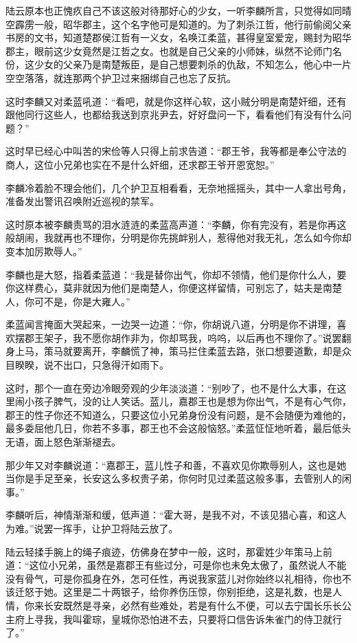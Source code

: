 陆云原本也正愧疚自己不该这般对待那好心的少女，一听李麟所言，只觉得如同晴空霹雳一般，昭华郡主，这个名字他可是知道的。为了刺杀江哲，他行前偷阅父亲书房的文书，知道楚郡侯江哲有一义女，名唤江柔蓝，甚得皇室爱宠，赐封为昭华郡主，眼前这少女竟然是江哲之女。也就是自己父亲的小师妹，纵然不论师门名份，这少女的父亲乃是南楚叛臣，是自己想要刺杀的仇敌，不知怎么，他心中一片空空落落，就连那两个护卫过来捆绑自己也忘了反抗。

这时李麟又对柔蓝吼道：“看吧，就是你这样心软，这小贼分明是南楚奸细，还有跟他同行这些人，也都给我送到京兆尹去，好好盘问一下，看看他们有没有什么问题？”

这时早已经心中叫苦的宋俭等人只得上前求告道：“郡王爷，我等都是奉公守法的商人，这位小兄弟也实在不是什么奸细，还求郡王爷开恩宽恕。”

李麟冷着脸不理会他们，几个护卫互相看看，无奈地摇摇头，其中一人拿出号角，准备发出警讯召唤附近巡视的禁军。

这时原本被李麟责骂的泪水涟涟的柔蓝高声道：“李麟，你有完没有，若是你再这般胡闹，我就再也不理你，分明是你先挑衅别人，惹得他对我无礼，怎么如今你却变本加厉欺辱人。”

李麟也是大怒，指着柔蓝道：“我是替你出气，你却不领情，他们是你什么人，要你这样费心，莫非就因为他们是南楚人，你便这样留情，可别忘了，姑夫是南楚人，你可不是，你是大雍人。”

柔蓝闻言掩面大哭起来，一边哭一边道：“你，你胡说八道，分明是你不讲理，喜欢摆郡王架子，我不愿你胡作非为，你却骂我，呜呜，以后再也不理你了。”说罢翻身上马，策马就要离开，李麟慌了神，策马拦住柔蓝去路，张口想要道歉，却是众目睽睽，说不出口，只急得汗如雨下。

这时，那个一直在旁边冷眼旁观的少年淡淡道：“别吵了，也不是什么大事，在这里闹小孩子脾气，没的让人笑话。蓝儿，嘉郡王也是想为你出气，不是有心气你，郡王的性子你还不知道么，只要这位小兄弟身份没有问题，是不会随便为难他的，最多委屈他几日，你若不多事，郡王也不会这般恼怒。”柔蓝怔怔地听着，最后低头无语，面上怒色渐渐褪去。

那少年又对李麟说道：“嘉郡王，蓝儿性子和善，不喜欢见你欺辱别人，这也是她当你是手足至亲，长安这么多权贵子弟，你何时见过柔蓝这般多事，去管别人的闲事。”

李麟听后，神情渐渐和缓，低声道：“霍大哥，是我不对，不该见猎心喜，和这人为难。”说罢一挥手，让护卫将陆云放了。

陆云轻揉手腕上的绳子痕迹，仿佛身在梦中一般，这时，那霍姓少年策马上前道：“这位小兄弟，虽然是嘉郡王有些过分，可是你也未免太傲了，虽然说人不能没有骨气，可是你孤身在外，怎可任性，再说我家蓝儿对你始终以礼相待，你也不该迁怒于她。这里是二十两银子，给你养伤压惊，你别拒绝，这是礼数，也是人情，你来长安既然是寻亲，必然有些难处，若是有什么不便，可以去宁国长乐长公主府上寻我，我叫霍琮，皇城你恐怕进不去，只要将口信告诉朱雀门的侍卫就行了。”

